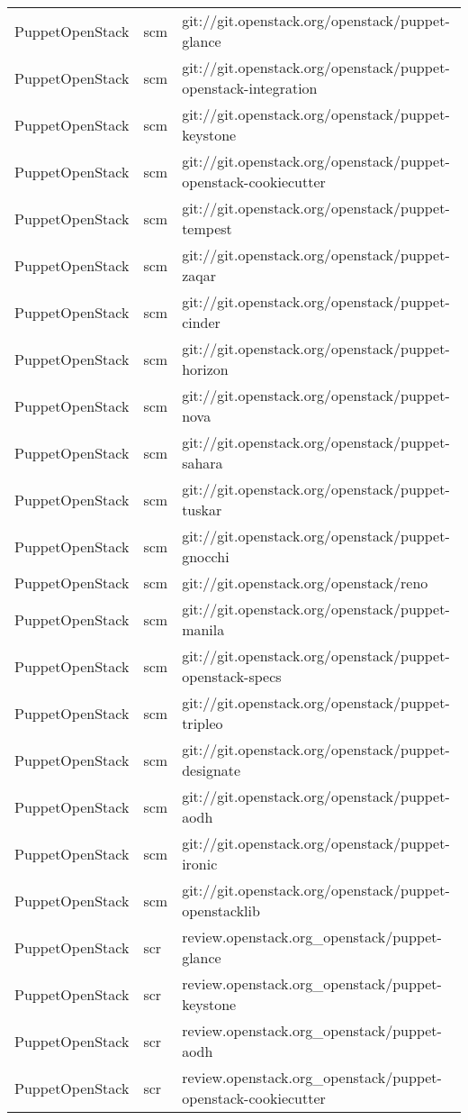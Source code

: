 \begin{center}
\begin{longtable}{|p{4cm}|p{1cm}|p{10cm}|}
PuppetOpenStack&scm&git://git.openstack.org/openstack/puppet-glance\\ 
PuppetOpenStack&scm&git://git.openstack.org/openstack/puppet-openstack-integration\\ 
PuppetOpenStack&scm&git://git.openstack.org/openstack/puppet-keystone\\ 
PuppetOpenStack&scm&git://git.openstack.org/openstack/puppet-openstack-cookiecutter\\ 
PuppetOpenStack&scm&git://git.openstack.org/openstack/puppet-tempest\\ 
PuppetOpenStack&scm&git://git.openstack.org/openstack/puppet-zaqar\\ 
PuppetOpenStack&scm&git://git.openstack.org/openstack/puppet-cinder\\ 
PuppetOpenStack&scm&git://git.openstack.org/openstack/puppet-horizon\\ 
PuppetOpenStack&scm&git://git.openstack.org/openstack/puppet-nova\\ 
PuppetOpenStack&scm&git://git.openstack.org/openstack/puppet-sahara\\ 
PuppetOpenStack&scm&git://git.openstack.org/openstack/puppet-tuskar\\ 
PuppetOpenStack&scm&git://git.openstack.org/openstack/puppet-gnocchi\\ 
PuppetOpenStack&scm&git://git.openstack.org/openstack/reno\\ 
PuppetOpenStack&scm&git://git.openstack.org/openstack/puppet-manila\\ 
PuppetOpenStack&scm&git://git.openstack.org/openstack/puppet-openstack-specs\\ 
PuppetOpenStack&scm&git://git.openstack.org/openstack/puppet-tripleo\\ 
PuppetOpenStack&scm&git://git.openstack.org/openstack/puppet-designate\\ 
PuppetOpenStack&scm&git://git.openstack.org/openstack/puppet-aodh\\ 
PuppetOpenStack&scm&git://git.openstack.org/openstack/puppet-ironic\\ 
PuppetOpenStack&scm&git://git.openstack.org/openstack/puppet-openstacklib\\ 
PuppetOpenStack&scr&review.openstack.org\_openstack/puppet-glance\\ 
PuppetOpenStack&scr&review.openstack.org\_openstack/puppet-keystone\\ 
PuppetOpenStack&scr&review.openstack.org\_openstack/puppet-aodh\\ 
PuppetOpenStack&scr&review.openstack.org\_openstack/puppet-openstack-cookiecutter\\ 

\end{longtable}
\end{center}
